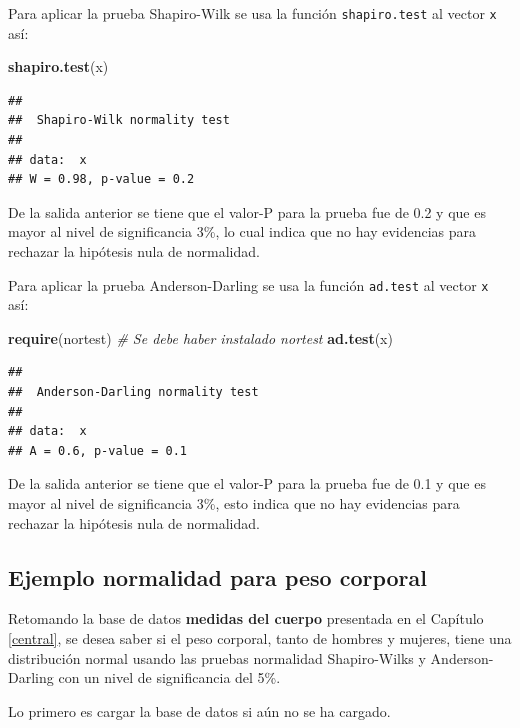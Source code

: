 \documentclass[10pt,]{krantz}
\makeatletter
\newenvironment{Shaded}{\begin{snugshade}}{\end{snugshade}}
\newcommand{\KeywordTok}[1]{\textcolor[rgb]{0.13,0.29,0.53}{\textbf{{#1}}}}
\newcommand{\CommentTok}[1]{\textcolor[rgb]{0.56,0.35,0.01}{\textit{{#1}}}}
\newcommand{\NormalTok}[1]{{#1}}
\newenvironment{kframe}{%
\medskip{}
\setlength{\fboxsep}{.8em}
 \def\at@end@of@kframe{}%
 \ifinner\ifhmode%
  \def\at@end@of@kframe{\end{minipage}}%
  \begin{minipage}{\columnwidth}%
 \fi\fi%
 \def\FrameCommand##1{\hskip\@totalleftmargin \hskip-\fboxsep
 \colorbox{shadecolor}{##1}\hskip-\fboxsep
     \hskip-\linewidth \hskip-\@totalleftmargin \hskip\columnwidth}%
 \MakeFramed {\advance\hsize-\width
   \@totalleftmargin\z@ \linewidth\hsize
   \@setminipage}}%
 {\par\unskip\endMakeFramed%
 \at@end@of@kframe}
\renewenvironment{Shaded}{\begin{kframe}}{\end{kframe}}
\makeatother
\begin{document}
Para aplicar la prueba Shapiro-Wilk se usa la función
\texttt{shapiro.test} al vector \texttt{x} así:

\begin{Shaded}
\begin{Highlighting}[]
\KeywordTok{shapiro.test}\NormalTok{(x)}
\end{Highlighting}
\end{Shaded}

\begin{verbatim}
## 
##  Shapiro-Wilk normality test
## 
## data:  x
## W = 0.98, p-value = 0.2
\end{verbatim}

De la salida anterior se tiene que el valor-P para la prueba fue de 0.2
y que es mayor al nivel de significancia 3\%, lo cual indica que no hay
evidencias para rechazar la hipótesis nula de normalidad.

Para aplicar la prueba Anderson-Darling se usa la función
\texttt{ad.test} al vector \texttt{x} así:

\begin{Shaded}
\begin{Highlighting}[]
\KeywordTok{require}\NormalTok{(nortest)  }\CommentTok{# Se debe haber instalado nortest}
\KeywordTok{ad.test}\NormalTok{(x)}
\end{Highlighting}
\end{Shaded}

\begin{verbatim}
## 
##  Anderson-Darling normality test
## 
## data:  x
## A = 0.6, p-value = 0.1
\end{verbatim}

De la salida anterior se tiene que el valor-P para la prueba fue de 0.1
y que es mayor al nivel de significancia 3\%, esto indica que no hay
evidencias para rechazar la hipótesis nula de normalidad.

\subsection*{Ejemplo normalidad para peso
corporal}\label{ejemplo-normalidad-para-peso-corporal}


Retomando la base de datos \textbf{medidas del cuerpo} presentada en el
Capítulo \ref{central}, se desea saber si el peso corporal, tanto de
hombres y mujeres, tiene una distribución normal usando las pruebas
normalidad Shapiro-Wilks y Anderson-Darling con un nivel de
significancia del 5\%.

Lo primero es cargar la base de datos si aún no se ha cargado.
\end{document}
